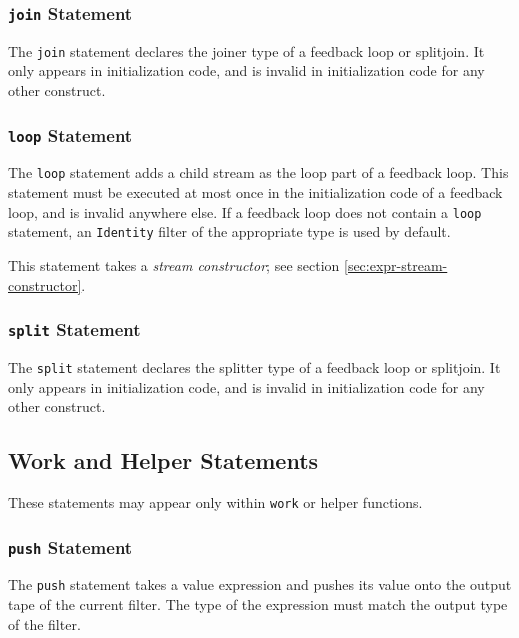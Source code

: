 \documentclass[11pt]{article}
\begin{document}
\subsubsection{\lstinline|join| Statement}

The \lstinline|join| statement declares the joiner type of a feedback
loop or splitjoin.  It only appears in initialization code, and is
invalid in initialization code for any other construct.  

\subsubsection{\lstinline|loop| Statement}

The \lstinline|loop| statement adds a child stream as the loop part of
a feedback loop.  This statement must be executed at most once in the
initialization code of a feedback loop, and is invalid anywhere else.
If a feedback loop does not contain a \lstinline|loop| statement, an
\lstinline|Identity| filter of the appropriate type is used by
default.

This statement takes a \emph{stream constructor}; see section
\ref{sec:expr-stream-constructor}.

\subsubsection{\lstinline|split| Statement}

The \lstinline|split| statement declares the splitter type of a feedback
loop or splitjoin.  It only appears in initialization code, and is
invalid in initialization code for any other construct.  

\subsection{Work and Helper Statements}

These statements may appear only within \lstinline|work| or helper
functions.

\subsubsection{\lstinline|push| Statement}

The \lstinline|push| statement takes a value expression and pushes its
value onto the output tape of the current filter.  The type of the
expression must match the output type of the filter.
\end{document}
